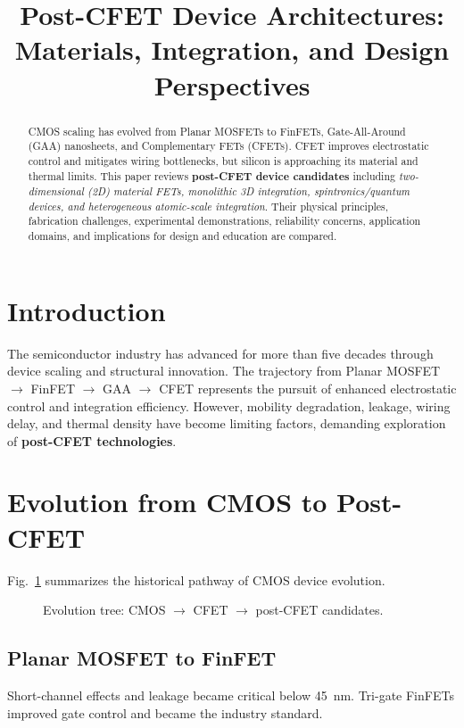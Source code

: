 \documentclass[conference]{IEEEtran}
\title{Post-CFET Device Architectures: Materials, Integration, and Design Perspectives}
\author{
\IEEEauthorblockN{Shinichi Samizo}
\IEEEauthorblockA{Independent Semiconductor Researcher\\
Project Design Hub, Samizo-AITL\\
\textit{Email:} \href{mailto:shin3t72@gmail.com}{shin3t72@gmail.com}\quad
\textit{GitHub:} \href{https://github.com/Samizo-AITL}{Samizo-AITL}}
}
\begin{document}
\maketitle

\begin{abstract}
CMOS scaling has evolved from Planar MOSFETs to FinFETs, Gate-All-Around (GAA) nanosheets, and Complementary FETs (CFETs). CFET improves electrostatic control and mitigates wiring bottlenecks, but silicon is approaching its material and thermal limits. This paper reviews \textbf{post-CFET device candidates} including \textit{two-dimensional (2D) material FETs, monolithic 3D integration, spintronics/quantum devices, and heterogeneous atomic-scale integration}. Their physical principles, fabrication challenges, experimental demonstrations, reliability concerns, application domains, and implications for design and education are compared.
\end{abstract}

\section{Introduction}
The semiconductor industry has advanced for more than five decades through device scaling and structural innovation.
The trajectory from Planar MOSFET $\rightarrow$ FinFET $\rightarrow$ GAA $\rightarrow$ CFET represents the pursuit of enhanced electrostatic control and integration efficiency.
However, mobility degradation, leakage, wiring delay, and thermal density have become limiting factors, demanding exploration of \textbf{post-CFET technologies}.

\section{Evolution from CMOS to Post-CFET}
Fig.~\ref{fig:evolution} summarizes the historical pathway of CMOS device evolution.

\begin{figure}[t]
  \centering
  
  \caption{Evolution tree: CMOS $\rightarrow$ CFET $\rightarrow$ post-CFET candidates.}
  \label{fig:evolution}
\end{figure}

\subsection{Planar MOSFET to FinFET}
Short-channel effects and leakage became critical below \SI{45}{\nano\meter}. Tri-gate FinFETs improved gate control and became the industry standard.
\end{document}
